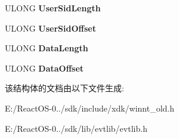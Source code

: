 \begin{DoxyCompactItemize}
U\+L\+O\+NG {\bfseries User\+Sid\+Length}
\item 
\mbox{\label{struct___e_v_e_n_t_l_o_g_r_e_c_o_r_d_a8f7680920fed1aa60da3c8c2221d1bbf}} 
U\+L\+O\+NG {\bfseries User\+Sid\+Offset}
\item 
\mbox{\label{struct___e_v_e_n_t_l_o_g_r_e_c_o_r_d_ac67a87763cbe080af11f9cd2b26d0392}} 
U\+L\+O\+NG {\bfseries Data\+Length}
\item 
\mbox{\label{struct___e_v_e_n_t_l_o_g_r_e_c_o_r_d_a0353c74959aec27ec3ec85bb5e4fdeec}} 
U\+L\+O\+NG {\bfseries Data\+Offset}
\end{DoxyCompactItemize}


该结构体的文档由以下文件生成\+:\begin{DoxyCompactItemize}
\item 
E\+:/\+React\+O\+S-\/0../sdk/include/xdk/winnt\+\_\+old.\+h\item 
E\+:/\+React\+O\+S-\/0../sdk/lib/evtlib/evtlib.\+h\end{DoxyCompactItemize}
